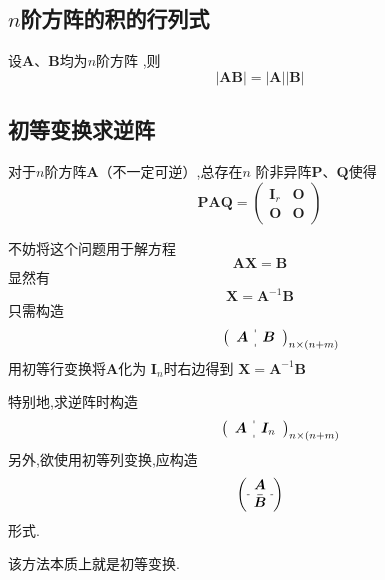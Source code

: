 \subsection{$n$阶方阵的积的行列式}
\begin{formal}
\begin{theorem}[方阵积的行列式]\label{thm:方阵积的行列式2}
    设$\bm{A}$、$\bm{B}$均为$n$阶方阵
    ,则
    \[
    \left|\bm{A}\bm{B}\right| = 
    \left|\bm{A}\right|\left|\bm{B}\right|
    \]
\end{theorem}
\end{formal}
\subsection{初等变换求逆阵}
\begin{green}
\begin{lemma}[相抵标准型]\label{lem:相抵标准型}
    对于$n$阶方阵$\bm{A}$（不一定可逆）,总存在$n$
    阶非异阵$\bm{P}$、$\bm{Q}$使得
    \[
    \bm{PAQ} = \begin{pmatrix}
        \bm{I}_r & \bm{O} \\
        \bm{O} & \bm{O}
    \end{pmatrix}
    \]
\end{lemma}
\end{green}
不妨将这个问题用于解方程
\[
\bm{A}\bm{X} = \bm{B}
\]
显然有
\[
\bm{X} = \bm{A}^{-1}\bm{B}
\]
只需构造
\[\qquad\quad
\left (
    \begin{array}{c:c}
        \begin{matrix}
            \bm{A}
        \end{matrix}
        &
        \begin{matrix}
            \bm{B}
        \end{matrix}
    \end{array}
\right )_{n \times \left(
    n + m
\right)}
\]
用初等行变换将$\bm{A}$化为
$\bm{I}_n$时右边得到
$\bm{X} = \bm{A}^{-1}\bm{B}$

特别地,求逆阵时构造
\[\qquad\quad
\left (
    \begin{array}{c:c}
        \begin{matrix}
            \bm{A}
        \end{matrix}
        &
        \begin{matrix}
            \bm{I}_n
        \end{matrix}
    \end{array}
\right )_{n \times \left(
    n + m
\right)}
\]
另外,欲使用初等列变换,应构造
\[
\left ( 
    \begin{array}{c}
        \bm{A} \\
        \hdashline
        \bm{B}
    \end{array}
\right )
\]
形式.
\begin{red}
\begin{remark}
    该方法本质上就是初等变换.
\end{remark}
\end{red}
\newpage

